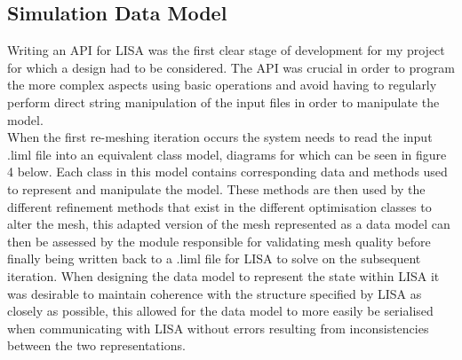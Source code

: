 \documentclass{article}
\begin{document}


\subsection{Simulation Data Model}
Writing an API for LISA was the first clear stage of development for my project for which a design had to be considered. The API was crucial in order to program the more complex aspects using basic operations and avoid having to regularly perform direct string manipulation of the input files in order to manipulate the model. \\

\noindent
When the first re-meshing iteration occurs the system needs to read the input .liml file into an equivalent class model, diagrams for which can be seen in figure 4 below. Each class in this model contains corresponding data and methods used to represent and manipulate the model. These methods are then used by the different refinement methods that exist in the different optimisation classes to alter the mesh, this adapted version of the mesh represented as a data model can then be assessed by the module responsible for validating mesh quality before finally being written back to a .liml file for LISA to solve on the subsequent iteration. When designing the data model to represent the state within LISA it was desirable to maintain coherence with the structure specified by LISA as closely as possible, this allowed for the data model to more easily be serialised when communicating with LISA without errors resulting from inconsistencies between the two representations. 
\end{document}
